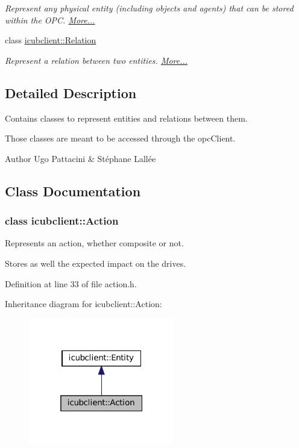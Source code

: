 \begin{DoxyCompactItemize}
\begin{DoxyCompactList}\small\item\em Represent any physical entity (including objects and agents) that can be stored within the O\+PC.  \hyperlink{group__icubclient__representations_classicubclient_1_1Object}{More...}\end{DoxyCompactList}\item 
class \hyperlink{group__icubclient__representations_classicubclient_1_1Relation}{icubclient\+::\+Relation}
\begin{DoxyCompactList}\small\item\em Represent a relation between two entities.  \hyperlink{group__icubclient__representations_classicubclient_1_1Relation}{More...}\end{DoxyCompactList}\end{DoxyCompactItemize}


\subsection{Detailed Description}
Contains classes to represent entities and relations between them. 

Those classes are meant to be accessed through the opc\+Client.

\begin{DoxyAuthor}{Author}
Ugo Pattacini \& Stéphane Lallée 
\end{DoxyAuthor}


\subsection{Class Documentation}
\label{classicubclient_1_1Action}
\subsubsection{class icubclient\+:\+:Action}
Represents an action, whether composite or not. 

Stores as well the expected impact on the drives. 

Definition at line 33 of file action.\+h.



Inheritance diagram for icubclient\+:\+:Action\+:
\nopagebreak
\begin{figure}[H]
\begin{center}
\leavevmode
\includegraphics[width=181pt]{classicubclient_1_1Action__inherit__graph}
\end{center}
\end{figure}
